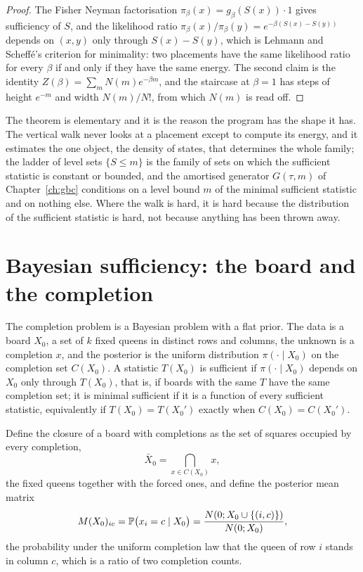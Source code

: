 \begin{proof}
The Fisher Neyman factorisation $\pi_\beta(x) = g_\beta(S(x)) \cdot 1$ gives sufficiency of $S$, and the likelihood ratio $\pi_\beta(x) / \pi_\beta(y) = e^{-\beta (S(x) - S(y))}$ depends on $(x, y)$ only through $S(x) - S(y)$, which is Lehmann and Scheff\'e's criterion \cite{LehmannScheffe} for minimality: two placements have the same likelihood ratio for every $\beta$ if and only if they have the same energy. The second claim is the identity $Z(\beta) = \sum_m N(m) e^{-\beta m}$, and the staircase at $\beta = 1$ has steps of height $e^{-m}$ and width $N(m) / N!$, from which $N(m)$ is read off.
\end{proof}

The theorem is elementary and it is the reason the program has the shape it has. The vertical walk never looks at a placement except to compute its energy, and it estimates the one object, the density of states, that determines the whole family; the ladder of level sets $\{ S \le m \}$ is the family of sets on which the sufficient statistic is constant or bounded, and the amortised generator $G(\tau, m)$ of Chapter~\ref{ch:gbc} conditions on a level bound $m$ of the minimal sufficient statistic and on nothing else. Where the walk is hard, it is hard because the distribution of the sufficient statistic is hard, not because anything has been thrown away.

\section{Bayesian sufficiency: the board and the completion}

The completion problem is a Bayesian problem with a flat prior. The data is a board $X_0$, a set of $k$ fixed queens in distinct rows and columns, the unknown is a completion $x$, and the posterior is the uniform distribution $\pi(\cdot \mid X_0)$ on the completion set $C(X_0)$. A statistic $T(X_0)$ is sufficient if $\pi(\cdot \mid X_0)$ depends on $X_0$ only through $T(X_0)$, that is, if boards with the same $T$ have the same completion set; it is minimal sufficient if it is a function of every sufficient statistic, equivalently if $T(X_0) = T(X_0')$ exactly when $C(X_0) = C(X_0')$.

Define the closure of a board with completions as the set of squares occupied by every completion,
\[
\bar X_0 = \bigcap_{x \in C(X_0)} x ,
\]
the fixed queens together with the forced ones, and define the posterior mean matrix
\[
M(X_0)_{ic} = \mathbb{P}\big( x_i = c \mid X_0 \big) = \frac{ N(0; X_0 \cup \{(i,c)\}) }{ N(0; X_0) } ,
\]
the probability under the uniform completion law that the queen of row $i$ stands in column $c$, which is a ratio of two completion counts.

